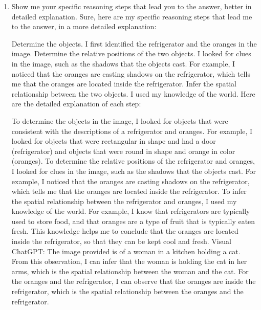 \begin{enumerate}
    Here are some additional details about the spatial relationship between the oranges and the refrigerator:
    
    The oranges are a type of fruit that is typically eaten fresh.
    The refrigerator is a kitchen appliance that is used for storing food.
    The oranges are inside the refrigerator, meaning that they are located inside the refrigerator.
    The oranges are not blocking the refrigerator door, meaning that the refrigerator door can be opened easily.
    Is there anything else I can help you with?
    \subitem Visual ChatGPT: The oranges are inside the refrigerator.
    \item Show me your specific reasoning steps that lead you to the answer, better in detailed explanation.
    \subitem 
    Sure, here are my specific reasoning steps that lead me to the answer, in a more detailed explanation:
    
    Determine the objects. I first identified the refrigerator and the oranges in the image.
    Determine the relative positions of the two objects. I looked for clues in the image, such as the shadows that the objects cast. For example, I noticed that the oranges are casting shadows on the refrigerator, which tells me that the oranges are located inside the refrigerator.
    Infer the spatial relationship between the two objects. I used my knowledge of the world.
    Here are the detailed explanation of each step:
    
    To determine the objects in the image, I looked for objects that were consistent with the descriptions of a refrigerator and oranges. For example, I looked for objects that were rectangular in shape and had a door (refrigerator) and objects that were round in shape and orange in color (oranges).
    To determine the relative positions of the refrigerator and oranges, I looked for clues in the image, such as the shadows that the objects cast. For example, I noticed that the oranges are casting shadows on the refrigerator, which tells me that the oranges are located inside the refrigerator.
    To infer the spatial relationship between the refrigerator and oranges, I used my knowledge of the world. For example, I know that refrigerators are typically used to store food, and that oranges are a type of fruit that is typically eaten fresh. This knowledge helps me to conclude that the oranges are located inside the refrigerator, so that they can be kept cool and fresh.
    \subitem Visual ChatGPT: The image provided is of a woman in a kitchen holding a cat. From this observation, I can infer that the woman is holding the cat in her arms, which is the spatial relationship between the woman and the cat. For the oranges and the refrigerator, I can observe that the oranges are inside the refrigerator, which is the spatial relationship between the oranges and the refrigerator.
\end{enumerate}